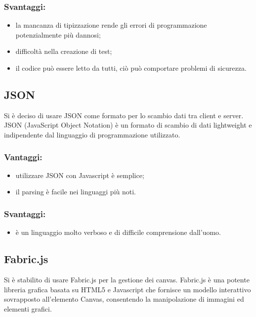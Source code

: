 \documentclass[a4paper, titlepage]{article}
\begin{document}
\subsubsection{Svantaggi:}

\begin{itemize}
	\item la mancanza di tipizzazione rende gli errori di programmazione potenzialmente più dannosi;
	\item difficoltà nella creazione di test;
	\item il codice può essere letto da tutti, ciò può comportare problemi di sicurezza.
\end{itemize}

\subsection{JSON}
Si è deciso di usare JSON come formato per lo scambio dati tra client e server. JSON (JavaScript Object Notation) è un formato di scambio di dati lightweight e indipendente dal linguaggio di programmazione utilizzato.

\subsubsection{Vantaggi:}

\begin{itemize}
	\item utilizzare JSON con Javascript è semplice;
	\item il parsing è facile nei linguaggi più noti.
\end{itemize}

\subsubsection{Svantaggi:}
	\begin{itemize}
	\item è un linguaggio molto verboso e di difficile comprensione dall'uomo.
	\end{itemize}

\subsection{Fabric.js}
Si è stabilito di usare Fabric.js per la gestione dei canvas. Fabric.js è una potente libreria grafica basata su HTML5 e Javascript che fornisce un modello interattivo sovrapposto all'elemento Canvas, consentendo la manipolazione di immagini ed elementi grafici.
\end{document}
